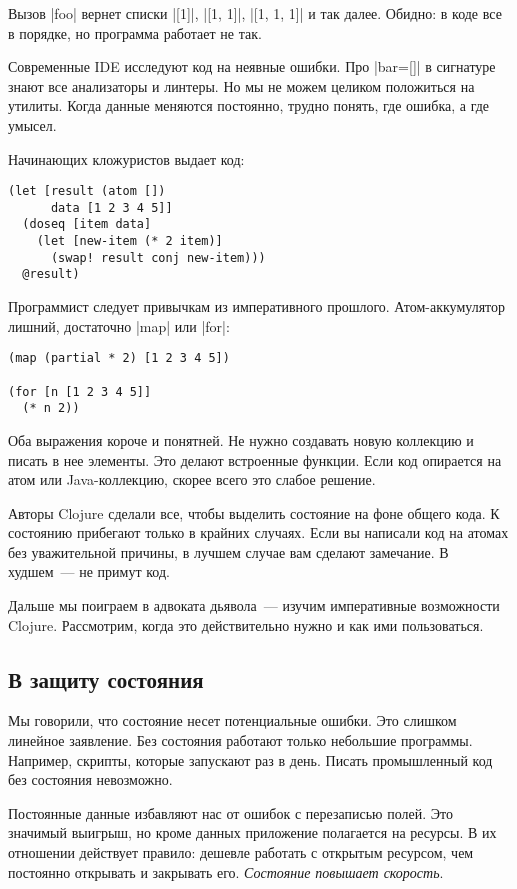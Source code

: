 Вызов \spverb|foo| вернет списки \spverb|[1]|, \spverb|[1, 1]|, \spverb|[1, 1, 1]|
и так далее. Обидно: в коде все в порядке, но программа работает не так.

Современные IDE исследуют код на неявные ошибки. Про \spverb|bar=[]| в сигнатуре
знают все анализаторы и линтеры. Но мы не можем целиком положиться на
утилиты. Когда данные меняются постоянно, трудно понять, где ошибка, а где
умысел.

Начинающих кложуристов выдает код:

\begin{verbatim}
(let [result (atom [])
      data [1 2 3 4 5]]
  (doseq [item data]
    (let [new-item (* 2 item)]
      (swap! result conj new-item)))
  @result)
\end{verbatim}

Программист следует привычкам из императивного прошлого. Атом-аккумулятор
лишний, достаточно \spverb|map| или \spverb|for|:

\begin{verbatim}
(map (partial * 2) [1 2 3 4 5])

(for [n [1 2 3 4 5]]
  (* n 2))
\end{verbatim}

Оба выражения короче и понятней. Не нужно создавать новую коллекцию и писать в
нее элементы. Это делают встроенные функции. Если код опирается на атом или
Java-коллекцию, скорее всего это слабое решение.

Авторы Clojure сделали все, чтобы выделить состояние на фоне общего кода. К
состоянию прибегают только в крайних случаях. Если вы написали код на атомах без
уважительной причины, в лучшем случае вам сделают замечание. В худшем~--- не
примут код.

Дальше мы поиграем в адвоката дьявола~--- изучим императивные возможности
Clojure. Рассмотрим, когда это действительно нужно и как ими пользоваться.

\subsection{В защиту состояния}

Мы говорили, что состояние несет потенциальные ошибки. Это слишком линейное
заявление. Без состояния работают только небольшие программы. Например, скрипты,
которые запускают раз в день. Писать промышленный код без состояния невозможно.

Постоянные данные избавляют нас от ошибок с перезаписью полей. Это значимый
выигрыш, но кроме данных приложение полагается на ресурсы. В их отношении
действует правило: дешевле работать с открытым ресурсом, чем постоянно открывать
и закрывать его. \emph{Состояние повышает скорость}.

